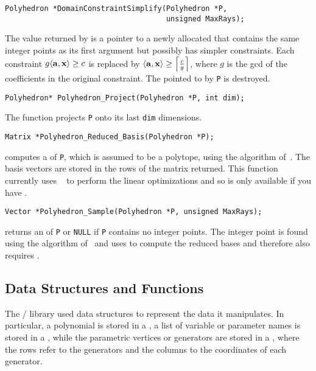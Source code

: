 \begin{verbatim}
Polyhedron *DomainConstraintSimplify(Polyhedron *P, 
                                     unsigned MaxRays);
\end{verbatim}
The value returned by
 is a pointer to
a newly allocated  that contains the 
same integer points as its first argument but possibly
has simpler constraints.
Each constraint $ g \sp a x \ge c $
is replaced by $ \sp a x \ge \ceil{ \frac c g } $,
where $g$ is the \ac{gcd} of the coefficients in the original
constraint.
The  pointed to by \verb+P+ is destroyed.

\begin{verbatim}
Polyhedron* Polyhedron_Project(Polyhedron *P, int dim);
\end{verbatim}
The function  projects
\verb+P+ onto its last \verb+dim+ dimensions.

\begin{verbatim}
Matrix *Polyhedron_Reduced_Basis(Polyhedron *P);
\end{verbatim}
 computes
a  of {\tt P}, which
is assumed to be a polytope, using the algorithm
of~.
The basis vectors are stored in the rows of the matrix returned.
This function currently uses ~
to perform the linear optimizations and so is only available
if you have .

\begin{verbatim}
Vector *Polyhedron_Sample(Polyhedron *P, unsigned MaxRays);
\end{verbatim}
 returns an  of {\tt P}
or {\tt NULL} if {\tt P} contains no integer points.
The integer point is found using the algorithm
of~ and uses
 to compute the reduced bases
and therefore also requires .

\subsection{\protect{} Data Structures and Functions}

The \bernstein/ library used  data structures to
represent the data it manipulates.
In particular, a polynomial is stored in a ,
a list of variable or parameter names is stored in a ,
while the parametric vertices or generators are stored in a ,
where the rows refer to the generators and the columns to the coordinates
of each generator.

